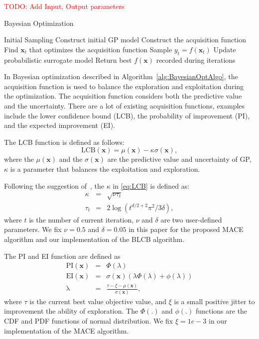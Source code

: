 \textcolor{red}{TODO: Add Input, Output parameters}
\begin{algorithm}
\caption{Bayesian Optimization}
\label{alg:BayesianOptAlgo}
\begin{algorithmic}[1]
\STATE Initial Sampling
\STATE Construct initial GP model
\STATE Construct the acquisition function
\STATE Find $\bm{x}_t$ that optimizes the acquisition function
\STATE Sample $y_t = f(\bm{x}_t)$
\STATE Update probabilistic surrogate model
\ENDFOR
\STATE Return best $f(\bm{x})$ recorded during iterations
\end{algorithmic}
\end{algorithm}

In Bayesian optimization described in Algorithm~\ref{alg:BayesianOptAlgo}, the acquisition function is used to balance the exploration and exploitation during the optimization. The acquisition function considers both the predictive value and the uncertainty. There are a lot of existing acquisition functions, examples include the lower confidence bound (LCB), the probability of improvement (PI), and the expected improvement (EI).

The LCB function is defined as follows:
\begin{equation}
    \label{eq:LCB}
    \mathrm{LCB}(\bm{x}) = \mu(\bm{x}) - \kappa \sigma(\bm{x}), 
\end{equation}
where the $\mu(\bm{x})$ and the $\sigma(\bm{x})$ are the predictive value and uncertainty of GP, $\kappa$ is a parameter that balances the exploitation and exploration. 

Following the suggestion of~\cite{brochu2010tutorial}, the $\kappa$ in \eqref{eq:LCB} is defined as:
\begin{equation}
    \label{eq:LCBKappa}
    \begin{array}{lll}
        \kappa &=& \sqrt{\nu \tau_t} \\
        \tau_t &=& 2 \log(t^{d/2+2} \pi^2 / 3 \delta),
    \end{array}
\end{equation}
where $t$ is the number of current iteration, $\nu$ and $\delta$ are two user-defined parameters. We fix $\nu = 0.5$ and $\delta = 0.05$ in this paper for the proposed MACE algorithm and our implementation of the BLCB algorithm.

The PI and EI function are defined as
\begin{equation}
    \label{eq:PI_EI}
    \begin{array}{lll}
        \mathrm{PI}(\bm{x}) &=& \Phi(\lambda) \\
        \mathrm{EI}(\bm{x}) &=& \sigma(\bm{x}) (\lambda \Phi(\lambda) + \phi(\lambda))     \\
        \mathrm{\lambda}    &=& \displaystyle \frac{\tau - \xi - \mu(\bm{x})}{\sigma(\bm{x})}, 
    \end{array}
\end{equation}
where $\tau$ is the current best value objective value, and $\xi$ is a small positive jitter to improvement the ability of exploration. The $\Phi(.)$ and $\phi(.)$ functions are the CDF and PDF functions of normal distribution. We fix $\xi = 1e-3$ in our implementation of the MACE algorithm.

